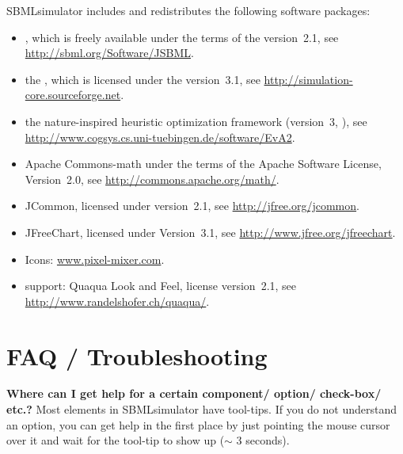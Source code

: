 SBMLsimulator includes and redistributes the following software packages:
\begin{itemize}
\item \JSBML \citep{Draeger2011, Rodriguez2015}, which is freely available under the terms of the \LGPL version~2.1, see \href{http://sbml.org/Software/JSBML}{\url{http://sbml.org/Software/JSBML}}.
\item the \SBSCL \citep{Keller2013}, which is licensed under the \LGPL version~3.1, see \href{http://simulation-core.sourceforge.net}{\url{http://simulation-core.sourceforge.net}}.
\item the nature-inspired heuristic optimization framework \EvA (\LGPL version~3, \citealp{Kron10EvA2}), see \href{http://www.cogsys.cs.uni-tuebingen.de/software/EvA2}{\url{http://www.cogsys.cs.uni-tuebingen.de/software/EvA2}}.
\item Apache Commons-math under the terms of the Apache Software License, Version~2.0, see \href{http://commons.apache.org/math/}{\url{http://commons.apache.org/math/}}.
\item JCommon, licensed under \LGPL version~2.1, see \href{http://jfree.org/jcommon}{\url{http://jfree.org/jcommon}}.
\item JFreeChart, licensed under \LGPL Version~3.1, see \href{http://www.jfree.org/jfreechart}{\url{http://www.jfree.org/jfreechart}}.
\item Icons: \href{http://www.pixel-mixer.com}{\url{www.pixel-mixer.com}}.
\item \MacOSX support: Quaqua Look and Feel, license \LGPL version~2.1, see \href{http://www.randelshofer.ch/quaqua/}{\url{http://www.randelshofer.ch/quaqua/}}.
\end{itemize}


\chapter{FAQ / Troubleshooting}
\label{ch:faq}


\noindent \textbf{Where can I get help for a certain component/ option/ check-box/ etc.?}\newline
Most elements in SBMLsimulator have tool-tips. If you do not understand an option, you
can get help in the first place by just pointing the mouse cursor over it and
wait for the tool-tip to show up ($\sim$ 3 seconds).\newline

